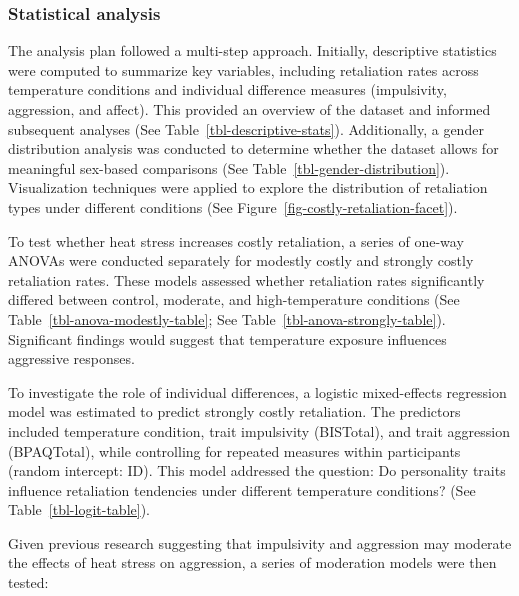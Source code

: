\documentclass[
  man,
  floatsintext,
  longtable,
  nolmodern,
  notxfonts,
  notimes,
  colorlinks=true,linkcolor=blue,citecolor=blue,urlcolor=blue]{apa7}
\begin{document}
\subsubsection{Statistical analysis}\label{statistical-analysis}

The analysis plan followed a multi-step approach. Initially, descriptive
statistics were computed to summarize key variables, including
retaliation rates across temperature conditions and individual
difference measures (impulsivity, aggression, and affect). This provided
an overview of the dataset and informed subsequent analyses (See
Table~\ref{tbl-descriptive-stats}). Additionally, a gender distribution
analysis was conducted to determine whether the dataset allows for
meaningful sex-based comparisons (See
Table~\ref{tbl-gender-distribution}). Visualization techniques were
applied to explore the distribution of retaliation types under different
conditions (See Figure~\ref{fig-costly-retaliation-facet}).

To test whether heat stress increases costly retaliation, a series of
one-way ANOVAs were conducted separately for modestly costly and
strongly costly retaliation rates. These models assessed whether
retaliation rates significantly differed between control, moderate, and
high-temperature conditions (See Table~\ref{tbl-anova-modestly-table};
See Table~\ref{tbl-anova-strongly-table}). Significant findings would
suggest that temperature exposure influences aggressive responses.

To investigate the role of individual differences, a logistic
mixed-effects regression model was estimated to predict strongly costly
retaliation. The predictors included temperature condition, trait
impulsivity (BISTotal), and trait aggression (BPAQTotal), while
controlling for repeated measures within participants (random intercept:
ID). This model addressed the question: Do personality traits influence
retaliation tendencies under different temperature conditions? (See
Table~\ref{tbl-logit-table}).

Given previous research suggesting that impulsivity and aggression may
moderate the effects of heat stress on aggression, a series of
moderation models were then tested:
\end{document}
